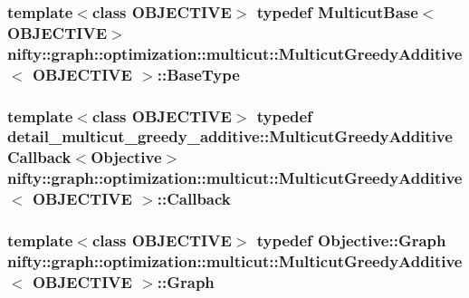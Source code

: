 \subsubsection[{Base\+Type}]{\setlength{\rightskip}{0pt plus 5cm}template$<$class O\+B\+J\+E\+C\+T\+I\+V\+E$>$ typedef {\bf Multicut\+Base}$<$O\+B\+J\+E\+C\+T\+I\+V\+E$>$ {\bf nifty\+::graph\+::optimization\+::multicut\+::\+Multicut\+Greedy\+Additive}$<$ O\+B\+J\+E\+C\+T\+I\+V\+E $>$\+::{\bf Base\+Type}}\label{classnifty_1_1graph_1_1optimization_1_1multicut_1_1MulticutGreedyAdditive_a4b7adaf94bc30fa94317f144b9defe18}
\hypertarget{classnifty_1_1graph_1_1optimization_1_1multicut_1_1MulticutGreedyAdditive_a416a5984d400e28b4274a4126f5ac362}{}
\subsubsection[{Callback}]{\setlength{\rightskip}{0pt plus 5cm}template$<$class O\+B\+J\+E\+C\+T\+I\+V\+E$>$ typedef detail\+\_\+multicut\+\_\+greedy\+\_\+additive\+::\+Multicut\+Greedy\+Additive\+Callback$<${\bf Objective}$>$ {\bf nifty\+::graph\+::optimization\+::multicut\+::\+Multicut\+Greedy\+Additive}$<$ O\+B\+J\+E\+C\+T\+I\+V\+E $>$\+::{\bf Callback}}\label{classnifty_1_1graph_1_1optimization_1_1multicut_1_1MulticutGreedyAdditive_a416a5984d400e28b4274a4126f5ac362}
\hypertarget{classnifty_1_1graph_1_1optimization_1_1multicut_1_1MulticutGreedyAdditive_a8003da1b1e5fc1aa51572f7887da3524}{}
\subsubsection[{Graph}]{\setlength{\rightskip}{0pt plus 5cm}template$<$class O\+B\+J\+E\+C\+T\+I\+V\+E$>$ typedef Objective\+::\+Graph {\bf nifty\+::graph\+::optimization\+::multicut\+::\+Multicut\+Greedy\+Additive}$<$ O\+B\+J\+E\+C\+T\+I\+V\+E $>$\+::{\bf Graph}}\label{classnifty_1_1graph_1_1optimization_1_1multicut_1_1MulticutGreedyAdditive_a8003da1b1e5fc1aa51572f7887da3524}
\hypertarget{classnifty_1_1graph_1_1optimization_1_1multicut_1_1MulticutGreedyAdditive_aae4ca5190ee50936fc0219aebbe95642}{}
